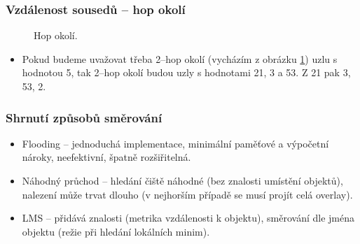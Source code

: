\documentclass[11pt,a4paper]{article}
\begin{document}
\subsubsection*{Vzdálenost sousedů -- hop okolí}
\begin{figure}[ht!]
\begin{center}
\caption{Hop okolí.}
\label{hop}
\end{center}
\end{figure}
\begin{itemize}
\item Pokud budeme uvažovat třeba 2--hop okolí (vycházím z obrázku \ref{hop}) uzlu s hodnotou 5, tak 2--hop okolí budou uzly s hodnotami 21, 3 a 53. Z 21 pak 3, 53, 2.
\end{itemize}

\subsubsection{Shrnutí způsobů směrování}
\begin{itemize}
\item Flooding -- jednoduchá implementace, minimální paměťové a výpočetní nároky, neefektivní, špatně rozšiřitelná.
\item Náhodný průchod -- hledání čiště náhodné (bez znalosti umístění objektů), nalezení může trvat dlouho (v nejhorším případě se musí projít celá overlay).
\item LMS -- přidává znalosti (metrika vzdálenosti k objektu), směrování dle jména objektu (režie při hledání lokálních minim).
\end{itemize}
\end{document}

